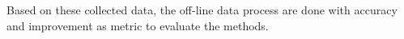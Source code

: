 



Based on these collected data, the off-line data process are done with accuracy and improvement as metric to evaluate the methods.  
%


